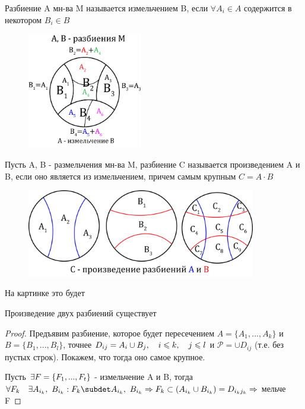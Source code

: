 \documentclass[discrete.tex]{subfiles}
\begin{document}
\begin{definition}
  Разбиение A мн-ва M называется измельчением B, если $\forall A_i \in A$ содержится в некотором $B_i \in B$
  \begin{figure}[H]
      \includegraphics[width=5cm]{pics/1_9.png}
      \centering
  \end{figure}
\end{definition}


\begin{definition}
  Пусть A, B - размельчения мн-ва M, разбиение C называется произведением A и B, если оно является из измельчением, причем самым крупным $C = A \cdot B$
  \begin{figure}[H]
      \includegraphics[width=10cm]{pics/1_10.png}
      \centering
  \end{figure}
\end{definition}

\begin{remark}
  На картинке это будет
\end{remark}

\begin{theorem}
  Произведение двух разбиений существует
\end{theorem}

\begin{proof}
  Предъявим разбиение, которое будет пересечением $A = \{A_1,...,A_k\}$ и $B = \{B_1,...,B_l\}$, точнее $D_{ij} = A_i \cup B_j,\quad i \leqslant k,\quad j \leqslant l$ и $\mathcal{P} = \cup D_{ij}$ (т.е. без пустых строк). Покажем, что тогда оно самое крупное.

  Пусть $\exists F = \{F_1,...,F_t\}$ - измельчение A и B, тогда $\forall F_k\q \e A_{i_k},\ B_{i_k}: F_k \subdet A_{i_k},\ B_{i_k} \Ra F_k \subset (A_{i_k} \cup B_{i_k}) = D_{i_k j_k} \Ra$ мельче F
\end{proof}
\end{document}
